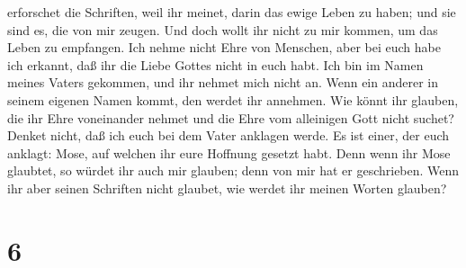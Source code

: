 erforschet die Schriften, weil ihr meinet, darin das ewige Leben zu
haben; und sie sind es, die von mir zeugen.  Und doch
wollt ihr nicht zu mir kommen, um das Leben zu empfangen.
 Ich nehme nicht Ehre von Menschen,  aber
bei euch habe ich erkannt, daß ihr die Liebe Gottes nicht in euch habt.
 Ich bin im Namen meines Vaters gekommen, und ihr nehmet
mich nicht an. Wenn ein anderer in seinem eigenen Namen kommt, den
werdet ihr annehmen.  Wie könnt ihr glauben, die ihr Ehre
voneinander nehmet und die Ehre vom alleinigen Gott nicht suchet?
 Denket nicht, daß ich euch bei dem Vater anklagen werde.
Es ist einer, der euch anklagt: Mose, auf welchen ihr eure Hoffnung
gesetzt habt.  Denn wenn ihr Mose glaubtet, so würdet ihr
auch mir glauben; denn von mir hat er geschrieben.  Wenn
ihr aber seinen Schriften nicht glaubet, wie werdet ihr meinen Worten
glauben?

\hypertarget{section-5}{%
\section{6}\label{section-5}}

